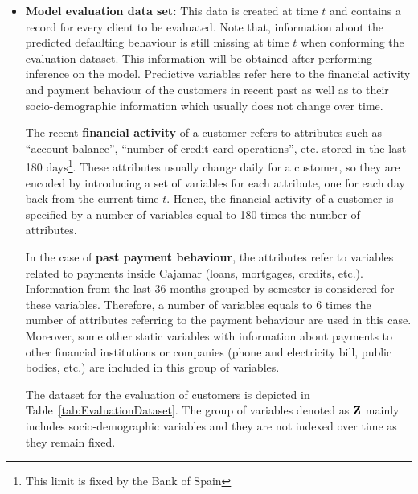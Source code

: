 \begin{itemize}

\item \textbf{Model evaluation data set:} This data is created at time $t$ and contains a record for every client to be evaluated. Note that, information about the predicted defaulting behaviour is still missing at time $t$ when conforming the evaluation dataset. This information will be obtained after performing inference on the model. Predictive variables refer here to the financial activity and payment behaviour of the customers in recent past as well as to their socio-demographic information which usually does not change over time.

The recent {\bf financial activity} of a customer refers to attributes such as ``account balance'', ``number of credit card operations'', etc. stored in the last 180 days\footnote{This limit is fixed by the Bank of Spain}. These attributes usually change daily for a customer, so they are encoded by introducing a set of variables for each attribute, one for each day back from the current time $t$. Hence, the financial activity of a customer is specified by a number of variables equal to 180 times the number of attributes. 

In the case of {\bf past payment behaviour}, the attributes refer to variables related to payments inside Cajamar (loans, mortgages, credits, etc.). Information from the last 36 months grouped by semester is considered for these variables. Therefore, a number of variables equals to $6$ times the number of attributes referring to the payment behaviour are used in this case. Moreover, some other static variables with information about payments to other financial institutions or companies (phone and electricity bill, public bodies, etc.) are included in this group of variables.

The dataset for the evaluation of customers is depicted in Table~\ref{tab:EvaluationDataset}. The group of variables denoted as $\mathbf{Z}$ mainly includes socio-demographic variables and they are not indexed over time as they remain fixed.  


\end{itemize}
